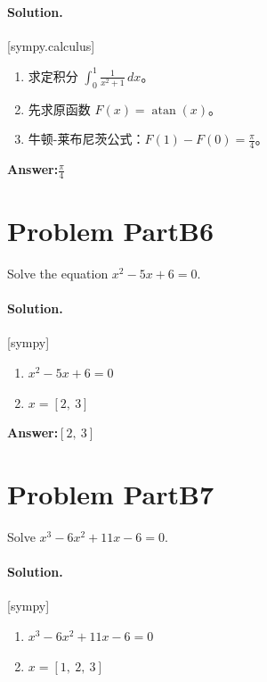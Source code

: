 \documentclass[11pt,a4paper]{ctexart}
\newcommand{\solvertag}[1]{{\footnotesize\color{gray}\textsf{[#1]}}}
\begin{document}
\paragraph{Solution.} \solvertag{sympy.calculus} 

\begin{enumerate}[leftmargin=*]
  \item 求定积分 $\displaystyle\int_{0}^{1} \frac{1}{x^{2} + 1}\, dx$。
  \item 先求原函数 $F(x) = \operatorname{atan}{\left(x \right)}$。
  \item 牛顿-莱布尼茨公式：$F(1) - F(0) = \frac{\pi}{4}$。
\end{enumerate}

\noindent\textbf{Answer:}\quad $\frac{\pi}{4}$

\medskip

\section*{Problem PartB6}
Solve the equation $x^2 - 5x + 6 = 0$.

\paragraph{Solution.} \solvertag{sympy} 

\begin{enumerate}[leftmargin=*]
  \item $x^{2} - 5 x + 6 = 0$
  \item $x = \left[ 2, \  3\right]$
\end{enumerate}

\noindent\textbf{Answer:}\quad $\left[ 2, \  3\right]$

\medskip

\section*{Problem PartB7}
Solve $x^3 - 6x^2 + 11x - 6 = 0$.

\paragraph{Solution.} \solvertag{sympy} 

\begin{enumerate}[leftmargin=*]
  \item $x^{3} - 6 x^{2} + 11 x - 6 = 0$
  \item $x = \left[ 1, \  2, \  3\right]$
\end{enumerate}
\end{document}
